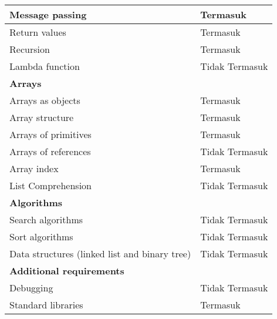 \begin{longtable}[c]{|l|l|}
  Message passing                               & Termasuk                               \\ \hline
  Return values                                 & Termasuk                               \\ \hline
  Recursion                                     & Termasuk                               \\ \hline
  Lambda function                               & Tidak Termasuk                         \\ \hline
  \textbf{Arrays}                               &                                        \\ \hline
  Arrays as objects                             & Termasuk                               \\ \hline
  Array structure                               & Termasuk                               \\ \hline
  Arrays of primitives                          & Termasuk                               \\ \hline
  Arrays of references                          & Tidak Termasuk                         \\ \hline
  Array index                                   & Termasuk                               \\ \hline
  List Comprehension                            & Tidak Termasuk                         \\ \hline
  \textbf{Algorithms}                           &                                        \\ \hline
  Search algorithms                             & Tidak Termasuk                         \\ \hline
  Sort algorithms                               & Tidak Termasuk                         \\ \hline
  Data structures (linked list and binary tree) & Tidak Termasuk                         \\ \hline
  \textbf{Additional requirements}              &                                        \\ \hline
  Debugging                                     & Tidak Termasuk                         \\ \hline
  Standard libraries                            & Termasuk                               \\ \hline
\end{longtable}
\normalsize
